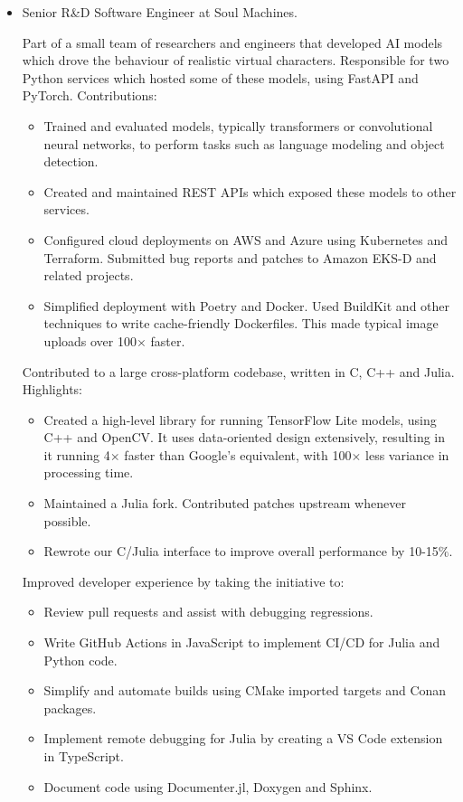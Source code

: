 \documentclass[10pt]{article}
\newcommand\asideformat{\bfseries\color{black!62.5}}
\newcommand\aside[1]{\hfill{\footnotesize\asideformat\raisebox{1pt}{#1}}}
\begin{document}
\begin{itemize}
\item
	Senior R\&D Software Engineer at Soul Machines. \aside{2020--2024}

	Part of a small team of researchers and engineers that developed AI models which drove the behaviour of realistic virtual characters.
	Responsible for two Python services which hosted some of these models, using FastAPI and PyTorch.
	Contributions:
	\begin{itemize}
	\item
		Trained and evaluated models, typically transformers or convolutional neural networks, to perform tasks such as language modeling and object detection.
	\item
		Created and maintained REST APIs which exposed these models to other services.
	\item
		Configured cloud deployments on AWS and Azure using Kubernetes and Terraform.
		Submitted bug reports and patches to Amazon EKS-D and related projects.
	\item
		Simplified deployment with Poetry and Docker.
		Used BuildKit and other techniques to write cache-friendly Dockerfiles.
		This made typical image uploads over 100$\times$ faster.
	\end{itemize}

	Contributed to a large cross-platform codebase, written in C, C++ and Julia.
	Highlights:
	\begin{itemize}
	\item
		Created a high-level library for running TensorFlow Lite models, using C++ and OpenCV.
		It uses data-oriented design extensively, resulting in it running 4$\times$ faster than Google's equivalent, with 100$\times$ less variance in processing time.
	\item
		Maintained a Julia fork.
		Contributed patches upstream whenever possible.
	\item
		Rewrote our C/Julia interface to improve overall performance by 10-15$\%$.
	\end{itemize}

	Improved developer experience by taking the initiative to:
	\begin{itemize}
	\item
		Review pull requests and assist with debugging regressions.
	\item
		Write GitHub Actions in JavaScript to implement CI/CD for Julia and Python code.
	\item
		Simplify and automate builds using CMake imported targets and Conan packages.
	\item
		Implement remote debugging for Julia by creating a VS Code extension in TypeScript.
	\item
		Document code using Documenter.jl, Doxygen and Sphinx.
	\end{itemize}
\end{itemize}
\end{document}
